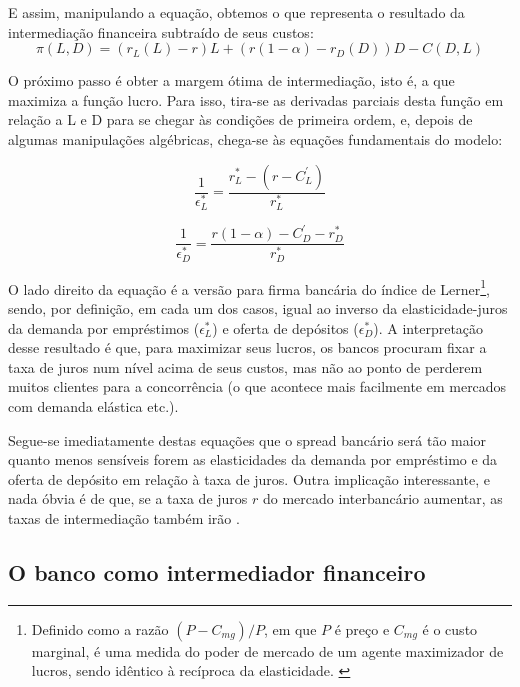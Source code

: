\documentclass[a4paper, 12pt, openany, oneside, brazil]{abntex2}
\begin{document}
	E assim, manipulando a equação, obtemos o que representa o resultado da intermediação financeira subtraído de seus custos: \begin{equation}\pi(L, D) = (r_L(L) - r)L + (r(1 - \alpha) - r_D(D))D - C(D, L)\end{equation}

	O próximo passo é obter a margem ótima de intermediação, isto é, a que maximiza a função lucro. Para isso, tira-se as derivadas parciais desta função em relação a L e D para se chegar às condições de primeira ordem, e, depois de algumas manipulações algébricas, chega-se às equações fundamentais do modelo:

	\begin{equation}
	\frac{1}{\epsilon^{*}_L} = \frac{r^{*}_L - (r - C^{'}_L)}{r^{*}_L}
	\end{equation}

	\begin{equation}
	\frac{1}{\epsilon^{*}_D} = \frac{r(1-\alpha)-C^{'}_D - r^{*}_D}{r^{*}_D}
	\end{equation}

	O lado direito da equação é a versão para firma bancária do índice de Lerner\footnote{ Definido como a razão $(P - C_{mg}) / P$, em que $P$ é preço e $C_{mg}$ é o custo marginal, é uma medida do poder de mercado de um agente maximizador de lucros, sendo idêntico à recíproca da elasticidade. \cite{maudos}}, sendo, por definição, em cada um dos casos, igual ao inverso da elasticidade-juros da demanda por empréstimos ($\epsilon^{*}_L$) e oferta de depósitos ($\epsilon^{*}_D$). A interpretação desse resultado é que, para maximizar seus lucros, os bancos procuram fixar a taxa de juros num nível acima de seus custos, mas não ao ponto de perderem muitos clientes para a concorrência (o que acontece mais facilmente em mercados com demanda elástica etc.).

	Segue-se imediatamente destas equações que o spread bancário será tão maior quanto menos sensíveis forem as elasticidades da demanda por empréstimo e da oferta de depósito em relação à taxa de juros. Outra implicação interessante, e nada óbvia é de que, se a taxa de juros $r$ do mercado interbancário aumentar, as taxas de intermediação também irão \cite[p.~59]{freixas}.

\subsection{O banco como intermediador financeiro}
\end{document}
